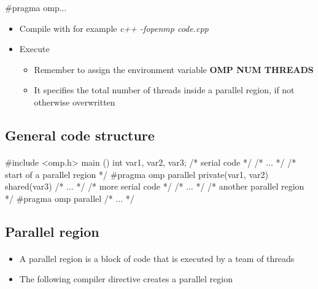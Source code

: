 \documentclass[%
oneside,                 %
final,                   %
10pt]{article}
\begin{document}
\noindent
\bcppcod
#pragma omp...
\ecppcod
\begin{itemize}
\item Compile with for example \emph{c++ -fopenmp code.cpp}

\item Execute
\begin{itemize}

  \item Remember to assign the environment variable \textbf{OMP NUM THREADS}

  \item It specifies the total number of threads inside a parallel region, if not otherwise overwritten
\end{itemize}

\noindent
\end{itemize}

\noindent



\subsection{General code structure}

\paragraph{}
\bcppcod
#include <omp.h>
main ()
{
int var1, var2, var3;
/* serial code */
/* ... */
/* start of a parallel region */
#pragma omp parallel private(var1, var2) shared(var3)
{
/* ... */
}
/* more serial code */
/* ... */
/* another parallel region */
#pragma omp parallel
{
/* ... */
}
}
\ecppcod



\subsection{Parallel region}

\paragraph{}
\begin{itemize}
\item A parallel region is a block of code that is executed by a team of threads

\item The following compiler directive creates a parallel region
\end{itemize}
\end{document}
